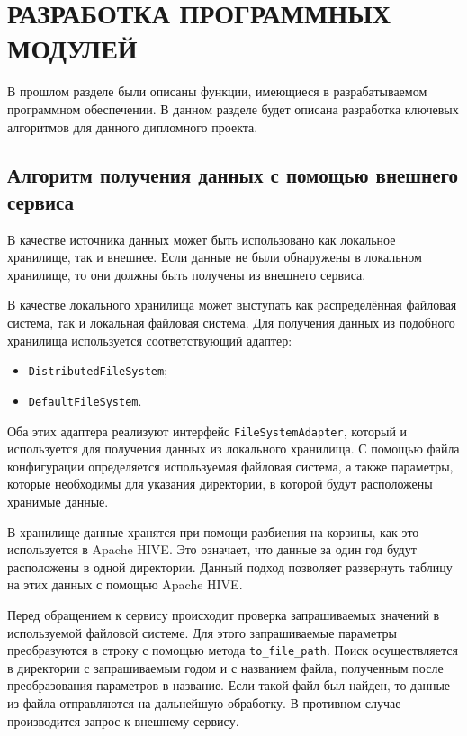 \pagebreak
\section{РАЗРАБОТКА ПРОГРАММНЫХ МОДУЛЕЙ}
\label{sec:dev}

\def\websockHandshakeScheme{ГУИР.400201.079 ПД2}

В прошлом разделе были описаны функции, имеющиеся в разрабатываемом программном обеспечении. 
В данном разделе будет описана разработка ключевых алгоритмов для данного дипломного проекта.

\subsection{Алгоритм получения данных с помощью внешнего сервиса}

В качестве источника данных может быть использовано как локальное хранилище, так и внешнее.
Если данные не были обнаружены в локальном хранилище, то они должны быть получены из внешнего сервиса.

В качестве локального хранилища может выступать как распределённая файловая система, так и локальная файловая система.
Для получения данных из подобного хранилища используется соответствующий адаптер:

\begin{itemize}
    \item \texttt{DistributedFileSystem};
    \item \texttt{DefaultFileSystem}.
\end{itemize}

Оба этих адаптера реализуют интерфейс \texttt{FileSystemAdapter}, который и используется для получения данных из локального хранилища.
С помощью файла конфигурации определяется используемая файловая система, а также параметры, которые необходимы для указания директории, в которой будут расположены хранимые данные.

В хранилище данные хранятся при помощи разбиения на корзины, как это используется в Apache HIVE.
Это означает, что данные за один год будут расположены в одной директории.
Данный подход позволяет развернуть таблицу на этих данных с помощью Apache HIVE.

Перед обращением к сервису происходит проверка запрашиваемых значений в используемой файловой системе.
Для этого запрашиваемые параметры преобразуются в строку с помощью метода \texttt{to\_file\_path}.
Поиск осуществляется в директории с запрашиваемым годом и с названием файла, полученным после преобразования параметров в название.
Если такой файл был найден, то данные из файла отправляются на дальнейшую обработку.
В противном случае производится запрос к внешнему сервису.

